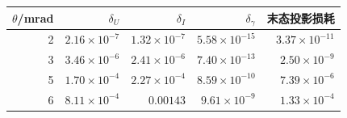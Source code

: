 \begin{tabular}{rrrrr}\toprule
$\theta$/mrad & $\delta_U$ & $\delta_I$ & $\delta_\gamma$ & 末态投影损耗\\\midrule
2 & \(2.16\times10^{-7}\) & \(1.32\times10^{-7}\) & \(5.58\times10^{-15}\) & \(3.37\times10^{-11}\)\\
3 & \(3.46\times10^{-6}\) & \(2.41\times10^{-6}\) & \(7.40\times10^{-13}\) & \(2.50\times10^{-9}\)\\
5 & \(1.70\times10^{-4}\) & \(2.27\times10^{-4}\) & \(8.59\times10^{-10}\) & \(7.39\times10^{-6}\)\\
6 & \(8.11\times10^{-4}\) & \(0.00143\) & \(9.61\times10^{-9}\) & \(1.33\times10^{-4}\)\\
\bottomrule\end{tabular}